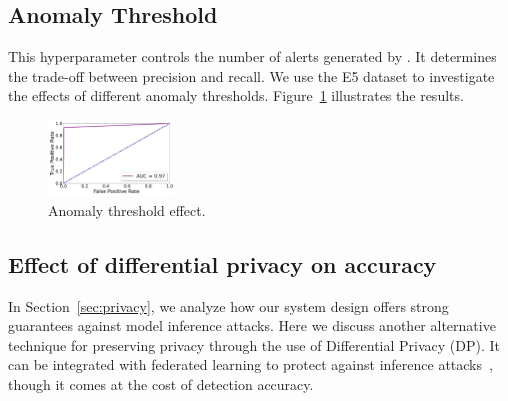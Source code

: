 
\subsection*{Anomaly Threshold}
\label{app:threshold}

This hyperparameter controls the number of alerts generated by \Sys. It determines the trade-off between precision and recall. We use the E5 dataset to investigate the effects of different anomaly thresholds. Figure~\ref{thresh} illustrates the results.

\begin{figure}[!t]
  \centering
  \includegraphics[width=0.3\textwidth]{fig/thresh.pdf}
  \caption{Anomaly threshold effect.}
  \label{thresh}
  \vspace{-2ex}
\end{figure}

\subsection*{Effect of differential privacy on accuracy}
\label{app:dp}

In Section~\ref{sec:privacy}, we analyze how our system design offers strong guarantees against model inference attacks. Here we discuss another alternative technique for preserving privacy through the use of Differential Privacy (DP). It can be integrated with federated learning to protect against inference attacks~\cite{lyu2020threats,nasr2019comprehensive,zari2021efficient}, though it comes at the cost of detection accuracy. 

